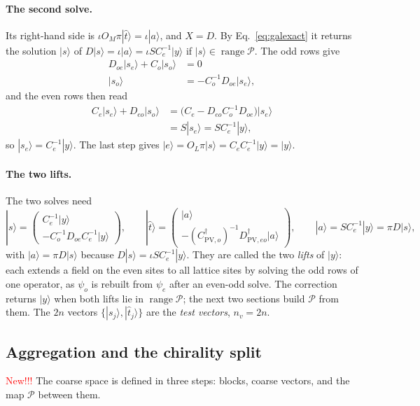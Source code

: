 \documentclass[11pt,a4paper]{article}
\numberwithin{equation}{section}
\newcommand{\dg}{^{\dagger}}
\newcommand{\Pro}{\mathcal P}
\newcommand{\Ce}{C_{e}}
\newcommand{\Co}{C_{o}}
\newcommand{\Cpvo}{C_{\mathrm{PV},o}}
\begin{document}
\paragraph{The second solve.} Its right-hand side is $\iota O_M\pi|\hat t\rangle=\iota|a\rangle$, and
$X=D$. By Eq.~\eqref{eq:galexact} it returns the solution $|s\rangle$ of
$D|s\rangle=\iota|a\rangle=\iota S\Ce^{-1}|y\rangle$ if $|s\rangle\in\operatorname{range}\Pro$. The
odd rows give
\begin{align}
D_{oe}|s_e\rangle+\Co|s_o\rangle&=0\nonumber\\
|s_o\rangle&=-\Co^{-1}D_{oe}|s_e\rangle ,
\end{align}
and the even rows then read
\begin{align}
\Ce|s_e\rangle+D_{eo}|s_o\rangle&=\big(\Ce-D_{eo}\Co^{-1}D_{oe}\big)|s_e\rangle\nonumber\\
&=S|s_e\rangle=S\Ce^{-1}|y\rangle ,
\end{align}
so $|s_e\rangle=\Ce^{-1}|y\rangle$. The last step gives
$|e\rangle=O_L\pi|s\rangle=\Ce\Ce^{-1}|y\rangle=|y\rangle$.

\paragraph{The two lifts.} The two solves need
\begin{equation}
|s\rangle=\begin{pmatrix}\Ce^{-1}|y\rangle\\-\Co^{-1}D_{oe}\Ce^{-1}|y\rangle\end{pmatrix},\qquad
|\hat t\rangle=\begin{pmatrix}|a\rangle\\-(\Cpvo\dg)^{-1}D_{\mathrm{PV},eo}\dg|a\rangle\end{pmatrix},\qquad
|a\rangle=S\Ce^{-1}|y\rangle=\pi D|s\rangle ,
\end{equation}
with $|a\rangle=\pi D|s\rangle$ because $D|s\rangle=\iota S\Ce^{-1}|y\rangle$. They are called the
two \emph{lifts} of $|y\rangle$: each extends a field on the even sites to all lattice sites by
solving the odd rows of one operator, as $\psi_o$ is rebuilt from $\psi_e$ after an even-odd
solve. The correction returns $|y\rangle$ when both lifts lie in $\operatorname{range}\Pro$; the
next two sections build $\Pro$ from them. The $2n$ vectors $\{|s_j\rangle,|\hat t_j\rangle\}$ are
the \emph{test vectors}, $n_v=2n$.

\subsection{Aggregation and the chirality split}
\label{sec:agg}
\textcolor{red}{New!!!} The coarse space is defined in three steps: blocks, coarse vectors, and
the map $\Pro$ between them.
\end{document}
